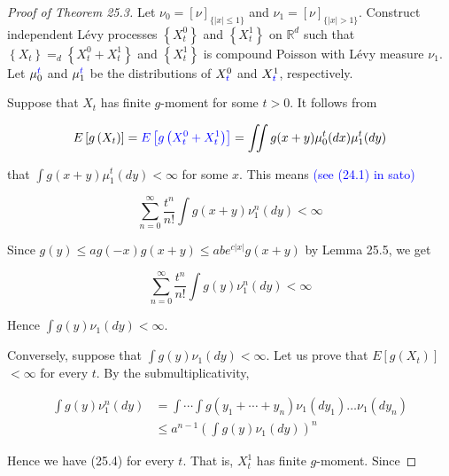 \documentclass[a4paper,11pt]{article}
\begin{document}
\begin{proof}[Proof of Theorem 25.3]

    Let $\nu_{0}=[\nu]_{\{|x| \leq 1\}}$ and $\nu_{1}=[\nu]_{\{|x|>1\}}$. Construct
    independent Lévy processes $\left\{X_{t}^{0}\right\}$ and $\left\{X_{t}^{1}\right\}$ on $\mathbb{R}^{d}$ such
    that $\left\{X_{t}\right\} =_{d} \left\{X_{t}^{0}+ X_{t}^{1}\right\}$ and
    $\left\{X_{t}^{1}\right\}$ is compound Poisson with Lévy measure $\nu_{1}$. Let $\mu_{0}^{\textcolor{blue}{t}}$ and $\mu_{1}^{\textcolor{blue}{t}}$ be
    the distributions of $X_{\textcolor{blue}{t}}^{0}$ and $X_{\textcolor{blue}{t}}^{1}$, respectively.

    Suppose that $X_{t}$ has finite $g$-moment for some $t>0$. It follows from

    $$
        E\left[g\left(X_{t}\right)\right]
        = \textcolor{blue}{ E\left[g\left(X^{0}_{t} + X^{1}_{t}\right)\right]}
        = \iint g(x+y) \mu_{0}^{t}(dx) \mu_{1}^{t}(dy)
    $$

    that $\int g(x+y) \mu_{1}^{t}(dy)<\infty$ for some $x$. This means \textcolor{blue}{(see (24.1) in sato)}

    $$
        \sum_{n=0}^{\infty} \frac{t^{n}}{n !} \int g(x+y) \nu_{1}^{n}(dy)<\infty
    $$

    Since $g(y) \leq a g(-x) g(x+y) \leq a b e^{c|x|} g(x+y)$ by Lemma 25.5, we get


    \begin{equation*}
        \sum_{n=0}^{\infty} \frac{t^{n}}{n !} \int g(y) \nu_{1}^{n}(dy)<\infty \tag{25.4}
    \end{equation*}

    Hence $\int g(y) \nu_{1}(d y)<\infty$.

    Conversely, suppose that $\int g(y) \nu_{1}(dy)<\infty$. Let us prove
    that $E\left[g\left(X_{t}\right)\right]$ $<\infty$ for every $t$. By the submultiplicativity,

    $$
        \begin{aligned}
            \int g(y) \nu_{1}^{n}(dy) & =\int \cdots \int g\left(y_{1}+\cdots+y_{n}\right) \nu_{1}\left(dy_{1}\right) \ldots \nu_{1}\left(d y_{n}\right) \\
                                      & \leq a^{n-1}\left(\int g(y) \nu_{1}(dy)\right)^{n}
        \end{aligned}
    $$

    Hence we have (25.4) for every $t$. That is, $X_{t}^{1}$ has finite $g$-moment. Since


\end{proof}
\end{document}
